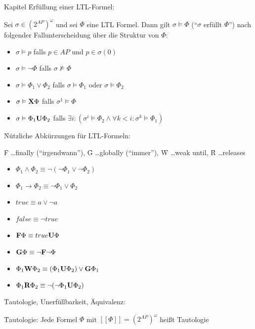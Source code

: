 \begin{chapter}{Kapitel}
\f{Erfüllung einer LTL-Formel}:
\vspace*{5pt}

\noindent Sei $\sigma \in (2^{AP})^\omega$ und sei $\Phi$ eine LTL Formel. Dann gilt $\sigma \vDash \Phi$ (``$\sigma$ erfüllt $\Phi$'') nach folgender
Fallunterscheidung über die Struktur von $\Phi$:
\begin{itemize}
 \item $\sigma \vDash p$ \qquad \qquad   falls $p\in AP$ und $p\in\sigma(0)$
 \item $\sigma \vDash \neg\Phi$ \qquad  \qquad falls $\sigma \nvDash \Phi$
 \item $\sigma \vDash \Phi_1 \vee \Phi_2$ \qquad falls $\sigma \vDash \Phi_1$ oder $\sigma \vDash \Phi_2$
 \item $\sigma \vDash \f{X}\Phi$ \qquad  \qquad falls $\sigma^1 \vDash \Phi $
 \item $\sigma \vDash \Phi_1\f{U}\Phi_2$ \qquad falls $\exists i: \left(\sigma^i\vDash \Phi_2 \wedge \forall k < i:\sigma^k \vDash \Phi_1 \right)$
\end{itemize}
\vspace*{5pt}

\f{Nützliche Abkürzungen für LTL-Formeln}:
\vspace*{4pt}

\f{F} \dots finally (``irgendwann''), \f{G} \dots globally (``immer''), \f{W} \dots weak until, \f{R} \dots releases
\begin{itemize}
 \item $\Phi_1\wedge\Phi_2 \equiv \neg(\neg\Phi_1\vee\neg\Phi_2)$
 \item $\Phi_1 \rightarrow \Phi_2 \equiv \neg\Phi_1\vee\Phi_2$
 \item $true \equiv a\vee\neg a$
 \item $false \equiv \neg true$
 \item $\f{F}\Phi \equiv true\f{U}\Phi$
 \item $\f{G}\Phi \equiv \neg\f{F}\neg\Phi$
 \item $\Phi_1\f{W}\Phi_2 \equiv (\Phi_1\f{U}\Phi_2)\vee\f{G}\Phi_1$
 \item $\Phi_1\f{R}\Phi_2 \equiv \neg(\neg\Phi_1\f{U}\Phi_2)$
\end{itemize}
\vspace*{5pt}

\f{Tautologie, Unerfüllbarkeit, Äquivalenz}:
\vspace*{4pt}

\f{Tautologie}: Jede Formel $\Phi$ mit $[[\Phi]] = \left(2^{AP}\right)^\omega$ heißt Tautologie
\vspace*{4pt}


\end{chapter}
